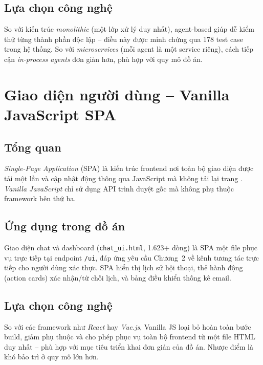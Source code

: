 \documentclass[../DoAn.tex]{subfiles}
\begin{document}
\subsection{Lựa chọn công nghệ}

So với kiến trúc \textit{monolithic} (một lớp xử lý duy nhất), agent-based giúp dễ kiểm thử từng thành phần độc lập -- điều này được minh chứng qua 178 test case trong hệ thống. So với \textit{microservices} (mỗi agent là một service riêng), cách tiếp cận \textit{in-process agents} đơn giản hơn, phù hợp với quy mô đồ án.

\section{Giao diện người dùng -- Vanilla JavaScript SPA}

\subsection{Tổng quan}

\textit{Single-Page Application} (SPA) là kiến trúc frontend nơi toàn bộ giao diện được tải một lần và cập nhật động thông qua JavaScript mà không tải lại trang \cite{flanagan2020javascript}. \textit{Vanilla JavaScript} chỉ sử dụng API trình duyệt gốc mà không phụ thuộc framework bên thứ ba.

\subsection{Ứng dụng trong đồ án}

Giao diện chat và dashboard (\texttt{chat\_ui.html}, 1.623+ dòng) là SPA một file phục vụ trực tiếp tại endpoint \texttt{/ui}, đáp ứng yêu cầu Chương~2 về kênh tương tác trực tiếp cho người dùng xác thực. SPA hiển thị lịch sử hội thoại, thẻ hành động (action cards) xác nhận/từ chối lịch, và bảng điều khiển thống kê email.

\subsection{Lựa chọn công nghệ}

So với các framework như \textit{React} hay \textit{Vue.js}, Vanilla JS loại bỏ hoàn toàn bước build, giảm phụ thuộc và cho phép phục vụ toàn bộ frontend từ một file HTML duy nhất -- phù hợp với mục tiêu triển khai đơn giản của đồ án. Nhược điểm là khó bảo trì ở quy mô lớn hơn.
\end{document}
